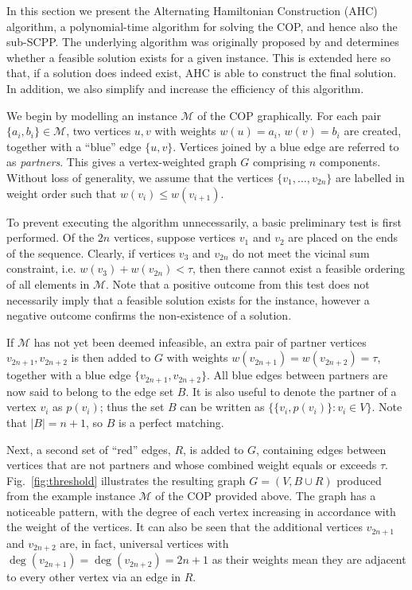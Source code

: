 \documentclass[a4paper,11pt,authoryear]{elsarticle}
\begin{document}
In this section we present the Alternating Hamiltonian Construction (AHC) algorithm, a polynomial-time algorithm for solving the COP, and hence also the sub-SCPP. The underlying algorithm was originally proposed by \cite{becker2010} and determines whether a feasible solution exists for a given instance. This is extended here so that, if a solution does indeed exist, AHC is able to construct the final solution. In addition, we also simplify and increase the efficiency of this algorithm.

We begin by modelling an instance $\mathcal{M}$ of the COP graphically. For each pair $\{a_i, b_i\} \in \mathcal{M}$, two vertices $u, v$ with weights $w(u) = a_i$, $w(v) = b_i$ are created, together with a ``blue'' edge $\{u, v\}$. Vertices joined by a blue edge are referred to as \textit{partners}. This gives a vertex-weighted graph $G$ comprising $n$ components. Without loss of generality, we assume that the vertices $\{v_1,\dotsc,v_{2n}\}$ are labelled in weight order such that $w(v_i) \leq w(v_{i+1})$.

To prevent executing the algorithm unnecessarily, a basic preliminary test is first performed. Of the $2n$ vertices, suppose vertices $v_1$ and $v_2$ are placed on the ends of the sequence. Clearly, if vertices $v_3$ and $v_{2n}$ do not meet the vicinal sum constraint, i.e. $w(v_3) + w(v_{2n}) < \tau$, then there cannot exist a feasible ordering of all elements in $\mathcal{M}$. Note that a positive outcome from this test does not necessarily imply that a feasible solution exists for the instance, however a negative outcome confirms the non-existence of a solution.

If $\mathcal{M}$ has not yet been deemed infeasible, an extra pair of partner vertices $v_{2n+1}, v_{2n+2}$ is then added to $G$ with weights $w(v_{2n+1}) = w(v_{2n+2}) = \tau$, together with a blue edge $\{v_{2n+1}, v_{2n+2}\}$. All blue edges between partners are now said to belong to the edge set $B$. It is also useful to denote the partner of a vertex $v_i$ as $p(v_i)$; thus the set $B$ can be written as $\{\{v_i, p(v_i)\} : v_i \in V\}$. Note that $|B| = n+1$, so $B$ is a perfect matching. 

Next, a second set of ``red'' edges, $R$, is added to $G$, containing edges between vertices that are not partners and whose combined weight equals or exceeds $\tau$. Fig.~\ref{fig:threshold} illustrates the resulting graph $G = (V, B \cup R)$ produced from the example instance $\mathcal{M}$ of the COP provided above. The graph has a noticeable pattern, with the degree of each vertex increasing in accordance with the weight of the vertices. It can also be seen that the additional vertices $v_{2n+1}$ and $v_{2n+2}$ are, in fact, universal vertices with $\deg(v_{2n+1}) = \deg(v_{2n+2}) = 2n+1$ as their weights mean they are adjacent to every other vertex via an edge in $R$.
\end{document}

